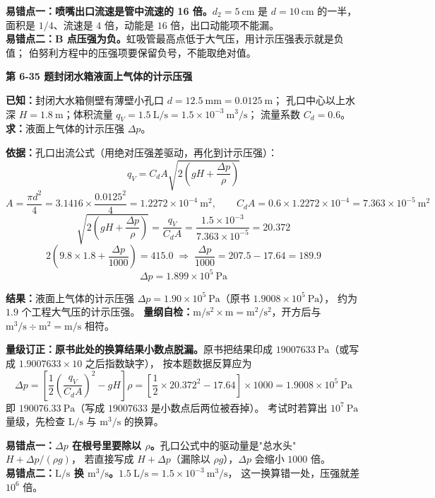 \begin{yicuo}
\textbf{易错点一：喷嘴出口流速是管中流速的 16 倍。}$d_2=5\ \mathrm{cm}$ 是 $d=10\ \mathrm{cm}$ 的一半，
面积是 $1/4$、流速是 $4$ 倍，动能是 $16$ 倍，出口动能项不能漏。\\
\textbf{易错点二：B 点压强为负。}虹吸管最高点低于大气压，用计示压强表示就是负值；
伯努利方程中的压强项要保留负号，不能取绝对值。
\end{yicuo}

\noindent\textbf{第 6-35 题\quad 封闭水箱液面上气体的计示压强}

\begin{jie}
\textbf{已知：}封闭大水箱侧壁有薄壁小孔口 $d=12.5\ \mathrm{mm}=0.0125\ \mathrm{m}$；
孔口中心以上水深 $H=1.8\ \mathrm{m}$；体积流量 $q_V=1.5\ \mathrm{L/s}=1.5\times10^{-3}\ \mathrm{m^3/s}$；
流量系数 $C_d=0.6$。
\textbf{求：}液面上气体的计示压强 $\Delta p$。

\textbf{依据：}孔口出流公式（用绝对压强差驱动，再化到计示压强）：
\[ q_V=C_dA\sqrt{2\left(gH+\frac{\Delta p}{\rho}\right)} \]
\[ A=\frac{\pi d^2}{4}=3.1416\times\frac{0.0125^2}{4}=1.2272\times10^{-4}\ \mathrm{m^2},\qquad
C_dA=0.6\times1.2272\times10^{-4}=7.363\times10^{-5}\ \mathrm{m^2} \]
\[ \sqrt{2\left(gH+\frac{\Delta p}{\rho}\right)}=\frac{q_V}{C_dA}
=\frac{1.5\times10^{-3}}{7.363\times10^{-5}}=20.372 \]
\[ 2\left(9.8\times1.8+\frac{\Delta p}{1000}\right)=415.0\;\Longrightarrow\;
\frac{\Delta p}{1000}=207.5-17.64=189.9 \]
\[ \Delta p=1.899\times10^5\ \mathrm{Pa} \]

\textbf{结果：}液面上气体的计示压强 $\Delta p=1.90\times10^5\ \mathrm{Pa}$（原书 $1.9008\times10^5\ \mathrm{Pa}$），
约为 $1.9$ 个工程大气压的计示压强。
\textbf{量纲自检：}$\mathrm{m/s^2\times m}=\mathrm{m^2/s^2}$，开方后与 $\mathrm{m^3/s\div m^2}=\mathrm{m/s}$ 相符。
\end{jie}

\begin{tishi}
\textbf{量级订正：原书此处的换算结果小数点脱漏。}原书把结果印成 $19007633\ \mathrm{Pa}$（或写成 $1.9007633\times10$ 之后指数缺字），
按本题数据反算应为
\[ \Delta p=\left[\frac{1}{2}\left(\frac{q_V}{C_dA}\right)^2-gH\right]\rho
=\left[\frac{1}{2}\times20.372^2-17.64\right]\times1000=1.9008\times10^5\ \mathrm{Pa} \]
即 $190076.33\ \mathrm{Pa}$（写成 $19007633$ 是小数点后两位被吞掉）。
考试时若算出 $10^7\ \mathrm{Pa}$ 量级，先检查 $\mathrm{L/s}$ 与 $\mathrm{m^3/s}$ 的换算。
\end{tishi}

\begin{yicuo}
\textbf{易错点一：$\Delta p$ 在根号里要除以 $\rho$。}孔口公式中的驱动量是"总水头"$H+\Delta p/(\rho g)$，
若直接写成 $H+\Delta p$（漏除以 $\rho g$），$\Delta p$ 会缩小 $1000$ 倍。\\
\textbf{易错点二：$\mathrm{L/s}$ 换 $\mathrm{m^3/s}$。}$1.5\ \mathrm{L/s}=1.5\times10^{-3}\ \mathrm{m^3/s}$，
这一换算错一处，压强就差 $10^6$ 倍。
\end{yicuo}

